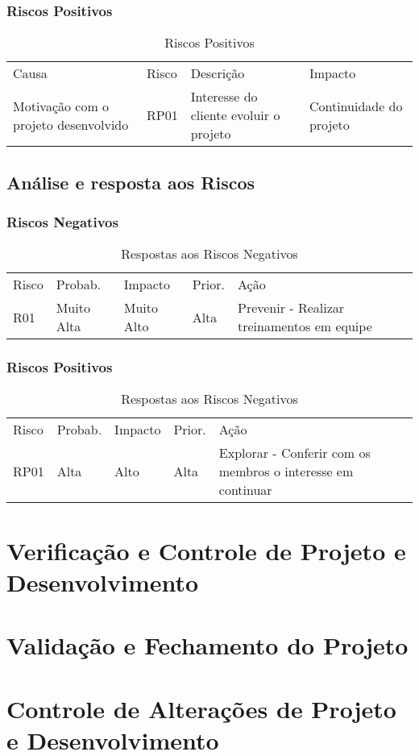 \subsubsection{Riscos Positivos}

\begin{table}[htp]
\centering
\caption{Riscos Positivos}
\label{riscos-positivos}
\begin{tabular}{llll}
Causa                                & Risco & Descrição                              & Impacto                 \\
Motivação com o projeto desenvolvido & RP01  & Interesse do cliente evoluir o projeto & Continuidade do projeto
\end{tabular}
\end{table}

\subsection{Análise e resposta aos Riscos}
\subsubsection{Riscos Negativos}

\begin{table}[htp]
\centering
\caption{Respostas aos Riscos Negativos}
\label{respostas-riscos-negativos}
\begin{tabular}{lllll}
Risco & Probab.    & Impacto    & Prior. & Ação                                       \\
R01   & Muito Alta & Muito Alto & Alta   & Prevenir - Realizar treinamentos em equipe
\end{tabular}
\end{table}

\subsubsection{Riscos Positivos}

\begin{table}[htp]
\centering
\caption{Respostas aos Riscos Negativos}
\label{respostas-riscos-positivos}
\begin{tabular}{lllll}
Risco & Probab. & Impacto & Prior. & Ação                                                        \\
RP01  & Alta    & Alto    & Alta   & Explorar - Conferir com os membros o interesse em continuar
\end{tabular}
\end{table}

\section{Verificação e Controle de Projeto e Desenvolvimento}

\section{Validação e Fechamento do Projeto}

\section{Controle de Alterações de Projeto e Desenvolvimento}

